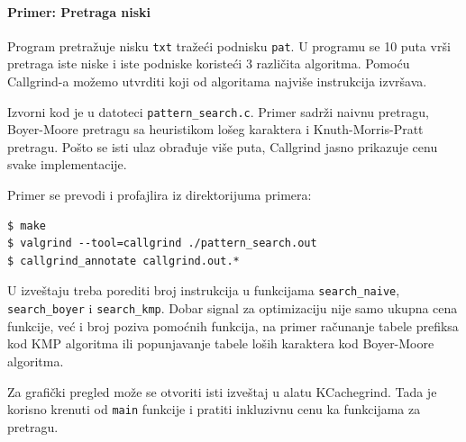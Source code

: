 \paragraph{Primer: Pretraga niski}\label{primer-pretraga-niski}

Program pretražuje nisku \texttt{txt} tražeći podnisku \texttt{pat}. U programu se 10 puta vrši pretraga iste niske i iste podniske koristeći 3 različita algoritma. Pomoću Callgrind-a možemo utvrditi koji od algoritama najviše instrukcija izvršava.

Izvorni kod je u datoteci \texttt{pattern\_search.c}. Primer sadrži naivnu pretragu, Boyer-Moore pretragu sa heuristikom lošeg karaktera i Knuth-Morris-Pratt pretragu. Pošto se isti ulaz obrađuje više puta, Callgrind jasno prikazuje cenu svake implementacije.

Primer se prevodi i profajlira iz direktorijuma primera:

\begin{verbatim}
$ make
$ valgrind --tool=callgrind ./pattern_search.out
$ callgrind_annotate callgrind.out.*
\end{verbatim}

U izveštaju treba porediti broj instrukcija u funkcijama \texttt{search\_naive}, \texttt{search\_boyer} i \texttt{search\_kmp}. Dobar signal za optimizaciju nije samo ukupna cena funkcije, već i broj poziva pomoćnih funkcija, na primer računanje tabele prefiksa kod KMP algoritma ili popunjavanje tabele loših karaktera kod Boyer-Moore algoritma.

Za grafički pregled može se otvoriti isti izveštaj u alatu KCachegrind. Tada je korisno krenuti od \texttt{main} funkcije i pratiti inkluzivnu cenu ka funkcijama za pretragu.
